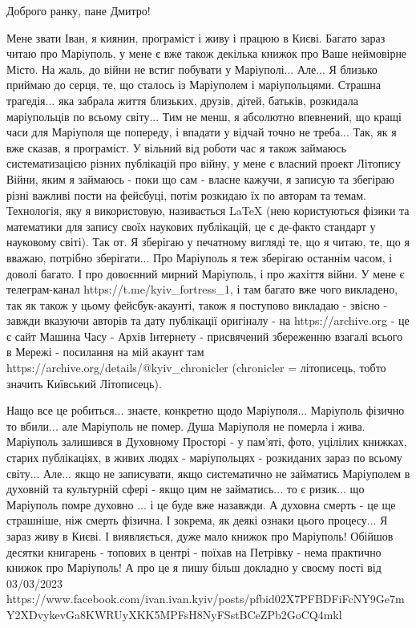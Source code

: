  
 
 
 
 

Доброго ранку, пане Дмитро!

Мене звати Іван, я киянин, програміст і живу і працюю в Києві. Багато зараз
читаю про Маріуполь, у мене є вже також декілька книжок про Ваше неймовірне
Місто. На жаль, до війни не встиг побувати у Маріуполі...
Але... Я близько приймаю до серця, те, що сталось із Маріуполем і
маріупольцями. Страшна трагедія... яка забрала життя близьких, друзів, дітей,
батьків, розкидала маріупольців по всьому світу...  Тим не менш, я абсолютно
впевнений, що кращі часи для Маріуполя ще попереду, і впадати у відчай точно не
треба...  Так, як я вже сказав, я програміст. У вільний від роботи час я також
займаюсь систематизацією різних публікацій про війну, у мене є власний проект
Літопису Війни, яким я займаюсь - поки що сам - власне кажучи, я записую та
збегіраю різні важливі пости на фейсбуці, потім розкидаю їх по авторам та
темам. Технологія, яку я використовую, називається LaTeX (нею користуються
фізики та математики для запису своїх наукових публікацій, це є де-факто
стандарт у науковому світі). Так от.  Я зберігаю у печатному вигляді те, що я
читаю, те, що я вважаю, потрібно зберігати...  Про Маріуполь я теж зберігаю
останнім часом, і доволі багато. І про довоєнний мирний Маріуполь, і про
жахіття війни. У мене є телеграм-канал https://t.me/kyiv_fortress_1, і там
багато вже чого викладено, так як також у цьому фейсбук-акаунті, також я
поступово викладаю - звісно - завжди вказуючи авторів та дату публікації
оригіналу - на https://archive.org - це є сайт Машина Часу - Архів Інтернету -
присвячений збереженню взагалі всього в Мережі - посилання на мій акаунт там
https://archive.org/details/@kyiv_chronicler (chronicler = літописець, тобто
значить Київський Літописець).

Нащо все це робиться... знаєте, конкретно щодо Маріуполя... Маріуполь фізично
то вбили...  але Маріуполь не помер. Душа Маріуполя не померла і жива.
Маріуполь залишився в Духовному Просторі - у пам'яті, фото, уцілілих книжках,
старих публікаціях, в живих людях - маріупольцях - розкиданих зараз по всьому
світу...  Але... якщо не записувати, якщо систематично не займатись Маріуполем
в духовній та культурній сфері - якщо цим не займатись... то є ризик... що
Маріуполь помре духовно ...  і це буде вже назавжди. А духовна смерть - це ще
страшніше, ніж смерть фізична. І зокрема, як деякі ознаки цього процесу... Я
зараз живу в Києві. І виявляється, дуже мало книжок про Маріуполь!  Обійшов
десятки книгарень - топових в центрі - поїхав на Петрівку - нема практично
книжок про Маріуполь!  А про це я пишу більш докладно у своєму пості від
03/03/2023
https://www.facebook.com/ivan.ivan.kyiv/posts/pfbid02X7PFBDFiFcNY9Ge7mY2XDvykevGa8KWRUyXKK5MPFsH8NyFSstBCeZPb2GoCQ4mkl

